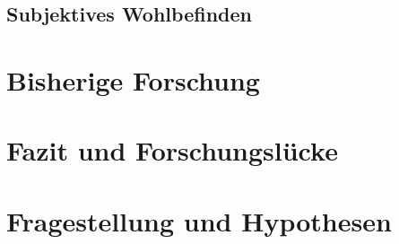 \subsection{Subjektives Wohlbefinden}\label{subsection.subjektivesWohlbefinden}

\section{Bisherige Forschung}\label{section.bisherigeForschung}

\section{Fazit und Forschungslücke}\label{section.fazitLücke}

\section{Fragestellung und Hypothesen}\label{section.fragestellung}




